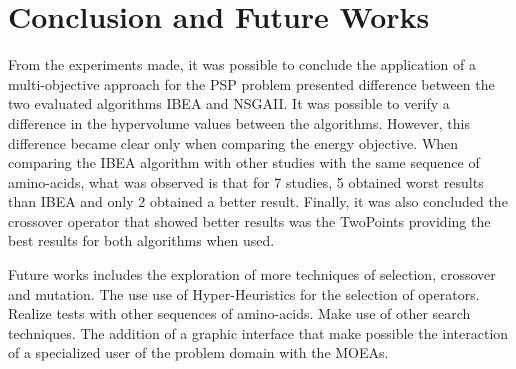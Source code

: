 \documentclass[conference]{IEEEtran}
\begin{document}
\section{Conclusion and Future Works} \label{sec:conclusion}


From the experiments made, it was possible to conclude the application of a multi-objective approach for the PSP problem presented difference between the two evaluated algorithms IBEA and NSGAII. It was possible to verify a difference in the hypervolume values between the algorithms. However, this difference became clear only when comparing the energy objective. When comparing the IBEA algorithm with other studies with the same sequence of amino-acids, what was observed is that for 7 studies, 5 obtained worst results than IBEA and only 2 obtained a better result. Finally, it was also concluded the crossover operator that showed better results was the TwoPoints providing the best results for both algorithms when used.


Future works includes the exploration of more techniques of selection, crossover and mutation. The use use of Hyper-Heuristics for the selection of operators. Realize tests with other sequences of amino-acids. Make use of other search techniques. The addition of a graphic interface that make possible the interaction of a specialized user of the problem domain with the MOEAs.





\end{document}
